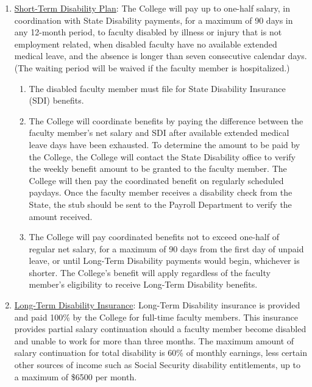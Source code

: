 
				\begin{enumerate}[label=\alph*)]
					\item{\underline{Short-Term Disability Plan}:  The College will pay up to one-half salary, in coordination with State Disability payments, for a maximum of 90 days in any 12-month period, to faculty disabled by illness or injury that is not employment related, when disabled faculty have no available extended medical leave, and the absence is longer than seven consecutive calendar days.  (The waiting period will be waived if the faculty member is hospitalized.)
						\begin{enumerate}[label=\arabic*)]

							\item{The disabled faculty member must file for State Disability Insurance (SDI) benefits.}
							\item{The College will coordinate benefits by paying the difference between the faculty member's net salary and SDI after available extended medical leave days have been exhausted.  To determine the amount to be paid by the College, the College will contact the State Disability office to verify the weekly benefit amount to be granted to the faculty member.  The College will then pay the coordinated benefit on regularly scheduled paydays.  Once the faculty member receives a disability check from the State, the stub should be sent to the Payroll Department to verify the amount received.}
							\item{The College will pay coordinated benefits not to exceed one-half of regular net salary, for a maximum of 90 days from the first day of unpaid leave, or until Long-Term Disability payments would begin, whichever is shorter.  The College's benefit will apply regardless of the faculty member's eligibility to receive Long-Term Disability benefits.}
						\end{enumerate}
					}


					\item{\underline{Long-Term Disability Insurance}:  Long-Term Disability insurance is provided
						and paid 100\% by the College for full-time faculty members.  This insurance
						provides partial salary continuation should a faculty member become disabled and
						unable to work for more than three months.  The maximum amount of salary
						continuation for total disability is 60\% of monthly earnings, less certain other
						sources of income such as Social Security disability entitlements, up to a
						maximum of \$6500 per month.
						\begin{enumerate}[label=\arabic*)]


\end{enumerate}}
\end{enumerate}
